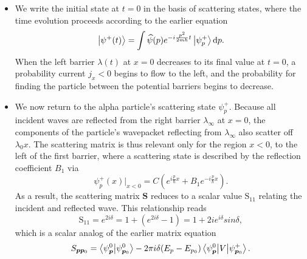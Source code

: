\documentclass[11pt, a4paper]{article}
\newcommand{\diff}{\mathop{}\!\mathrm{d}} %
\renewcommand{\vec}[1]{\bm{#1}}  %
\newcommand{\mat}[1]{\mathbf{#1}}  %
\newcommand{\F}[1]{\widehat{#1}} %
\renewcommand{\SS}{\mat{S}}  %
\begin{document}
\begin{itemize}
    \item We write the initial state at $ t = 0 $ in the basis of scattering states, where the time evolution proceeds according to the earlier equation
    \begin{equation*}
        \ket{\psi^{+}(t)} = \int \F{\psi}(p) e^{-i \frac{p^{2}}{2m \hbar}t } \ket{\psi_{p}^{+}} \diff p.
    \end{equation*}
    When the left barrier $ \lambda(t) $ at $ x = 0 $ decreases to its final value at $ t = 0 $, a probability current $ j_{x} < 0 $ begins to flow to the left, and the probability for finding the particle between the potential barriers begins to decrease. 

    \item We now return to the alpha particle's scattering state $ \psi_{p}^{+} $. Because all incident waves are reflected from the right barrier $ \lambda_{\infty} $ at $ x = 0 $, the components of the particle's wavepacket reflecting from $ \lambda_{\infty} $ also scatter off $ \lambda_{0}x $. The scattering matrix is thus relevant only for the region $ x < 0 $, to the left of the first barrier, where a scattering state is described by the reflection coefficient $ B_{1} $ via
    \begin{equation*}
        \psi_{p}^{+}(x) \big|_{x < 0} = C \left( e^{i \frac{p}{\hbar}x} + B_{1} e^{- i \frac{p}{\hbar}x} \right).
    \end{equation*}
    As a result, the scattering matrix $ \SS $ reduces to a scalar value $ \mathrm{S}_{11} $ relating the incident and reflected wave. This relationship reads 
    \begin{equation*}
        \mathrm{S}_{11} = e^{2 i \delta} = 1 + \left( e^{2i \delta} - 1 \right) = 1 + 2ie^{i\delta}sin \delta,
    \end{equation*}
    which is a scalar analog of the earlier matrix equation
    \begin{equation*}
        S_{\vec{p}\vec{p}_{0}} = \braket{\psi_{\vec{p}}^{0}}{\psi_{\vec{p}_{0}}^{0}} - 2\pi i \delta(E_{p} - E_{p_{0}})\mel{\psi_{\vec{p}}^{0}}{V}{\psi_{\vec{p}_{0}}^{+}}.
    \end{equation*}
    
\end{itemize}
\end{document}
